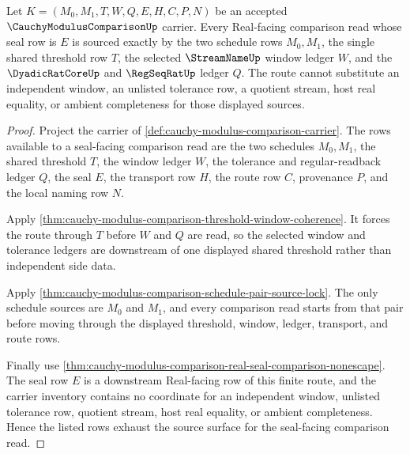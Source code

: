 \begin{theorem}
\label{thm:cauchy-modulus-comparison-window-ledger-source-exhaustion}
Let $K=(M_0,M_1,T,W,Q,E,H,C,P,N)$ be an accepted $\CauchyModulusComparisonUp$ carrier. Every Real-facing comparison read whose seal row is $E$ is sourced exactly by the two schedule rows $M_0,M_1$, the single shared threshold row $T$, the selected $\StreamNameUp$ window ledger $W$, and the $\DyadicRatCoreUp$ and $\RegSeqRatUp$ ledger $Q$. The route cannot substitute an independent window, an unlisted tolerance row, a quotient stream, host real equality, or ambient completeness for those displayed sources.
\end{theorem}
\begin{proof}
Project the carrier of \autoref{def:cauchy-modulus-comparison-carrier}. The rows available to a seal-facing comparison read are the two schedules $M_0,M_1$, the shared threshold $T$, the window ledger $W$, the tolerance and regular-readback ledger $Q$, the seal $E$, the transport row $H$, the route row $C$, provenance $P$, and the local naming row $N$.

Apply \autoref{thm:cauchy-modulus-comparison-threshold-window-coherence}. It forces the route through $T$ before $W$ and $Q$ are read, so the selected window and tolerance ledgers are downstream of one displayed shared threshold rather than independent side data.

Apply \autoref{thm:cauchy-modulus-comparison-schedule-pair-source-lock}. The only schedule sources are $M_0$ and $M_1$, and every comparison read starts from that pair before moving through the displayed threshold, window, ledger, transport, and route rows.

Finally use \autoref{thm:cauchy-modulus-comparison-real-seal-comparison-nonescape}. The seal row $E$ is a downstream Real-facing row of this finite route, and the carrier inventory contains no coordinate for an independent window, unlisted tolerance row, quotient stream, host real equality, or ambient completeness. Hence the listed rows exhaust the source surface for the seal-facing comparison read.
\end{proof}

